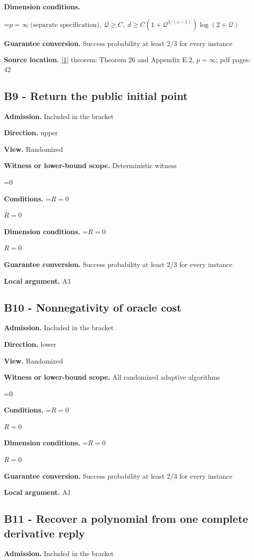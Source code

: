\documentclass[10pt,a4paper]{article}
\newcommand{\AtlasMath}[1]{\par\begingroup\centering\setbox0=\hbox{$\displaystyle #1$}\ifdim\wd0>1.4\linewidth\typeout{ATLAS WIDE FORMULA: \the\wd0}\fi\ifdim\wd0>\linewidth\resizebox{\linewidth}{!}{\box0}\else\box0\fi\par\endgroup}
\newcommand{\AtlasInlineMath}[1]{\begingroup\setbox0=\hbox{$#1$}\ifdim\wd0>.4\linewidth\endgroup\AtlasMath{#1}\else\endgroup$#1$\fi}
\begin{document}
\textbf{Dimension conditions.} 
\AtlasMath{p=\infty\ \text{(separate specification)},\ \mathcal{Q}\ge C,\ d\ge C(1+\mathcal{Q}^{3/(s-1)})\log(2+\mathcal{Q})}


\textbf{Guarantee conversion.} Success probability at least 2/3 for every instance

\textbf{Source location.} \href{https://arxiv.org/pdf/2411.08987v2}{[1]} theorem: Theorem 26 and Appendix E.2, $p=\infty$; pdf pages: 42

\subsection{B9 - Return the public initial point}
\textbf{Admission.} Included in the bracket

\textbf{Direction.} upper

\textbf{View.} Randomized

\textbf{Witness or lower-bound scope.} Deterministic witness

\AtlasMath{0}
\textbf{Conditions.} \AtlasInlineMath{R=0}

\textbf{Dimension conditions.} \AtlasInlineMath{R=0}

\textbf{Guarantee conversion.} Success probability at least 2/3 for every instance

\textbf{Local argument.} A1

\subsection{B10 - Nonnegativity of oracle cost}
\textbf{Admission.} Included in the bracket

\textbf{Direction.} lower

\textbf{View.} Randomized

\textbf{Witness or lower-bound scope.} All randomized adaptive algorithms

\AtlasMath{0}
\textbf{Conditions.} \AtlasInlineMath{R=0}

\textbf{Dimension conditions.} \AtlasInlineMath{R=0}

\textbf{Guarantee conversion.} Success probability at least 2/3 for every instance

\textbf{Local argument.} A1

\subsection{B11 - Recover a polynomial from one complete derivative reply}
\textbf{Admission.} Included in the bracket
\end{document}
